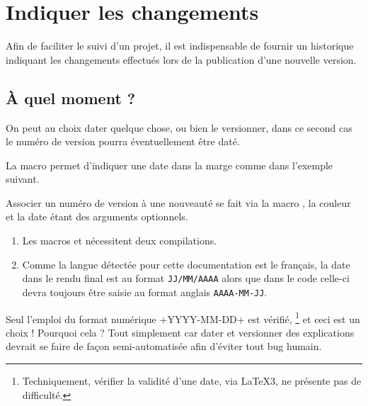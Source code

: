 \documentclass[theme = color]{tutodoc}
\begin{document}
\section{Indiquer les changements}

Afin de faciliter le suivi d'un projet, il est indispensable de fournir un historique indiquant les changements effectués lors de la publication d'une nouvelle version.



\subsection{À quel moment ?}
\label{tutodoc-changes-when}

On peut au choix dater quelque chose, ou bien le versionner, dans ce second cas le numéro de version pourra éventuellement être daté.


\begin{tdocexa}
    La macro  permet d'indiquer une date dans la marge comme dans l'exemple suivant.

\end{tdocexa}


\begin{tdocexa}
    Associer un numéro de version à une nouveauté se fait via la macro , la couleur et la date étant des arguments optionnels.

\end{tdocexa}


\begin{tdocimp}
    \begin{enumerate}[wide]
        \item Les macros  et  nécessitent deux compilations.

        \item Comme la langue détectée pour cette documentation est le français, la date dans le rendu final est au format \texttt{JJ/MM/AAAA} alors que dans le code celle-ci devra toujours être saisie au format anglais \texttt{AAAA-MM-JJ}.
    \end{enumerate}
\end{tdocimp}


\begin{tdoccaut}
    Seul l'emploi du format numérique \tdocinlatex+YYYY-MM-DD+ est vérifié,
    \footnote{
        Techniquement, vérifier la validité d'une date, via \LaTeX3, ne présente pas de difficulté.
    }
    et ceci est un choix ! Pourquoi cela ? Tout simplement car dater et versionner des explications devrait se faire de façon semi-automatisée afin d'éviter tout bug humain.
\end{tdoccaut}
\end{document}
